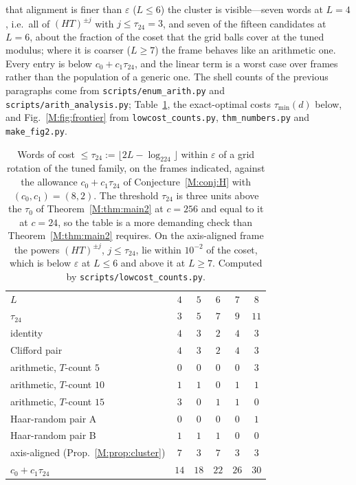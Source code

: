 \documentclass[aps,prx,twocolumn,superscriptaddress,nofootinbib,longbibliography]{revtex4-2}
\theoremstyle{plain}
\theoremstyle{definition}
\theoremstyle{remark}
\begin{document}
that alignment is finer than $\varepsilon$ ($L\le6$) the cluster is visible---seven words at $L=4$, i.e.\ all of $(HT)^{\pm j}$ with $j\le\tau_{24}=3$, and seven of the fifteen candidates at $L=6$, about the fraction of the coset that the grid balls cover at the tuned modulus; where it is coarser ($L\ge7$) the frame behaves like an arithmetic one. Every entry is below $c_0+c_1\tau_{24}$, and the linear term is a worst case over frames rather than the population of a generic one. The shell counts of the previous paragraphs come from \texttt{scripts/\allowbreak enum\_arith.py} and \texttt{scripts/\allowbreak arith\_analysis.py}; Table~\ref{tab:lowcost}, the exact-optimal costs $\tau_{\min}(d)$ below, and Fig.~\ref{M:fig:frontier} from \texttt{lowcost\_counts.py}, \texttt{thm\_numbers.py} and \texttt{make\_fig2.py}.
\begin{table}[t]
\centering\footnotesize
\caption{Words of cost $\le\tau_{24}:=\lfloor2L-\log_224\rfloor$ within $\varepsilon$ of a grid rotation of the tuned family, on the frames indicated, against the allowance $c_0+c_1\tau_{24}$ of Conjecture~\ref{M:conj:H} with $(c_0,c_1)=(8,2)$. The threshold $\tau_{24}$ is three units above the $\tau_0$ of Theorem~\ref{M:thm:main2} at $c=256$ and equal to it at $c=24$, so the table is a more demanding check than Theorem~\ref{M:thm:main2} requires. On the axis-aligned frame the powers $(HT)^{\pm j}$, $j\le\tau_{24}$, lie within $10^{-2}$ of the coset, which is below $\varepsilon$ at $L\le6$ and above it at $L\ge7$. Computed by \texttt{scripts/lowcost\_counts.py}.}
\label{tab:lowcost}
\setlength{\tabcolsep}{4pt}\begin{tabular}{@{}l ccccc@{}}
\toprule
$L$ & $4$ & $5$ & $6$ & $7$ & $8$\\
$\tau_{24}$ & $3$ & $5$ & $7$ & $9$ & $11$\\
\midrule
identity & $4$ & $3$ & $2$ & $4$ & $3$\\
Clifford pair & $4$ & $3$ & $2$ & $4$ & $3$\\
arithmetic, $T$-count $5$ & $0$ & $0$ & $0$ & $0$ & $3$\\
arithmetic, $T$-count $10$ & $1$ & $1$ & $0$ & $1$ & $1$\\
arithmetic, $T$-count $15$ & $3$ & $0$ & $1$ & $1$ & $0$\\
Haar-random pair A & $0$ & $0$ & $0$ & $0$ & $1$\\
Haar-random pair B & $1$ & $1$ & $1$ & $0$ & $0$\\
axis-aligned (Prop.~\ref{M:prop:cluster}) & $7$ & $3$ & $7$ & $3$ & $3$\\
\midrule
$c_0+c_1\tau_{24}$ & $14$ & $18$ & $22$ & $26$ & $30$\\
\bottomrule
\end{tabular}
\end{table}
\end{document}

